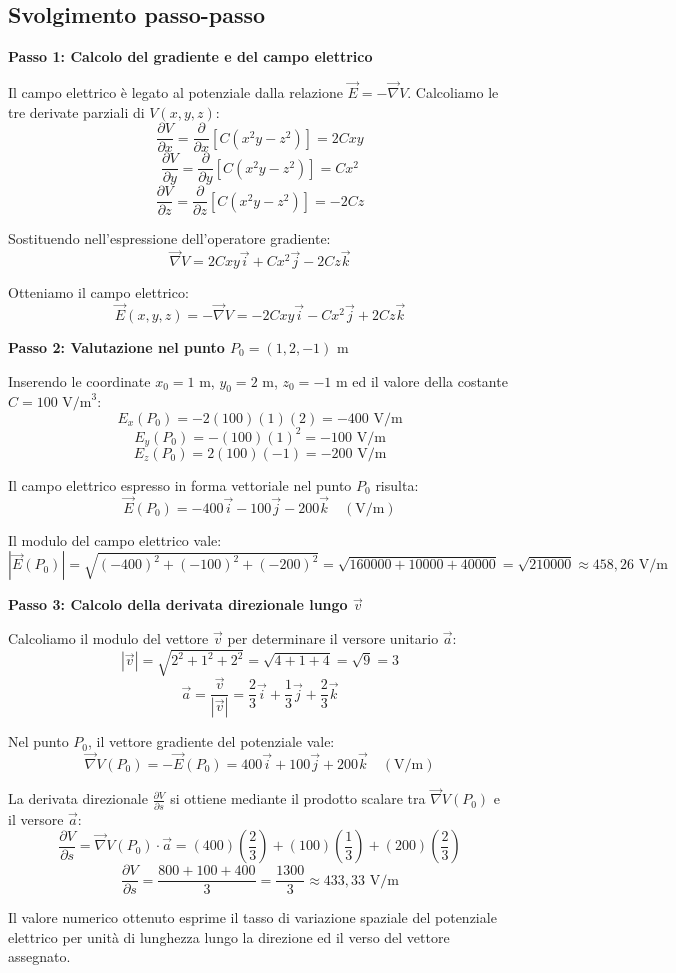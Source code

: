 \documentclass[12pt, a4paper]{article}
\begin{document}
\subsection{Svolgimento passo-passo}

\textbf{Passo 1: Calcolo del gradiente e del campo elettrico}

Il campo elettrico è legato al potenziale dalla relazione $\vec{E} = -\vec{\nabla}V$.
Calcoliamo le tre derivate parziali di $V(x,y,z)$:
\[
\frac{\partial V}{\partial x} = \frac{\partial}{\partial x} \left[ C(x^2 y - z^2) \right] = 2 C x y
\]
\[
\frac{\partial V}{\partial y} = \frac{\partial}{\partial y} \left[ C(x^2 y - z^2) \right] = C x^2
\]
\[
\frac{\partial V}{\partial z} = \frac{\partial}{\partial z} \left[ C(x^2 y - z^2) \right] = -2 C z
\]

Sostituendo nell'espressione dell'operatore gradiente:
\[
\vec{\nabla}V = 2Cxy \vec{i} + Cx^2 \vec{j} - 2Cz \vec{k}
\]

Otteniamo il campo elettrico:
\[
\vec{E}(x,y,z) = -\vec{\nabla}V = -2Cxy \vec{i} - Cx^2 \vec{j} + 2Cz \vec{k}
\]

\textbf{Passo 2: Valutazione nel punto $P_0 = (1, 2, -1) \text{ m}$}

Inserendo le coordinate $x_0 = 1 \text{ m}$, $y_0 = 2 \text{ m}$, $z_0 = -1 \text{ m}$ ed il valore della costante $C = 100 \text{ V/m}^3$:
\[
E_x(P_0) = -2 (100) (1) (2) = -400 \text{ V/m}
\]
\[
E_y(P_0) = -(100) (1)^2 = -100 \text{ V/m}
\]
\[
E_z(P_0) = 2 (100) (-1) = -200 \text{ V/m}
\]

Il campo elettrico espresso in forma vettoriale nel punto $P_0$ risulta:
\[
\vec{E}(P_0) = -400 \vec{i} - 100 \vec{j} - 200 \vec{k} \quad (\text{V/m})
\]

Il modulo del campo elettrico vale:
\[
|\vec{E}(P_0)| = \sqrt{(-400)^2 + (-100)^2 + (-200)^2} = \sqrt{160000 + 10000 + 40000} = \sqrt{210000} \approx 458{,}26 \text{ V/m}
\]

\textbf{Passo 3: Calcolo della derivata direzionale lungo $\vec{v}$}

Calcoliamo il modulo del vettore $\vec{v}$ per determinare il versore unitario $\vec{a}$:
\[
|\vec{v}| = \sqrt{2^2 + 1^2 + 2^2} = \sqrt{4 + 1 + 4} = \sqrt{9} = 3
\]
\[
\vec{a} = \frac{\vec{v}}{|\vec{v}|} = \frac{2}{3}\vec{i} + \frac{1}{3}\vec{j} + \frac{2}{3}\vec{k}
\]

Nel punto $P_0$, il vettore gradiente del potenziale vale:
\[
\vec{\nabla}V(P_0) = -\vec{E}(P_0) = 400 \vec{i} + 100 \vec{j} + 200 \vec{k} \quad (\text{V/m})
\]

La derivata direzionale $\frac{\partial V}{\partial s}$ si ottiene mediante il prodotto scalare tra $\vec{\nabla}V(P_0)$ e il versore $\vec{a}$:
\[
\frac{\partial V}{\partial s} = \vec{\nabla}V(P_0) \cdot \vec{a} = (400)\left(\frac{2}{3}\right) + (100)\left(\frac{1}{3}\right) + (200)\left(\frac{2}{3}\right)
\]
\[
\frac{\partial V}{\partial s} = \frac{800 + 100 + 400}{3} = \frac{1300}{3} \approx 433{,}33 \text{ V/m}
\]

Il valore numerico ottenuto esprime il tasso di variazione spaziale del potenziale elettrico per unità di lunghezza lungo la direzione ed il verso del vettore assegnato.
\end{document}
